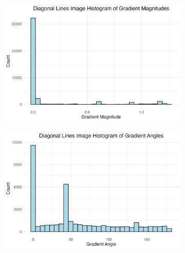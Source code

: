 \documentclass[
  letterpaper,
  DIV=11,
  numbers=noendperiod]{scrreprt}
\begin{document}
\begin{figure}

\begin{minipage}{0.25\linewidth}

\begin{figure}[H]

{\centering \includegraphics{images/plots/diagonal/diag_histogram_mag_plot.jpg}

}


\end{figure}%

\end{minipage}%
%
\begin{minipage}{0.25\linewidth}

\begin{figure}[H]

{\centering \includegraphics{images/plots/diagonal/diag_histogram_theta_plot.jpg}

}
\end{figure}
\end{minipage}
\end{figure}
\end{document}
